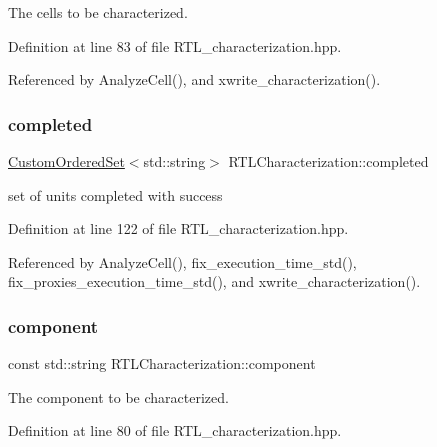 The cells to be characterized. 



Definition at line 83 of file R\+T\+L\+\_\+characterization.\+hpp.



Referenced by Analyze\+Cell(), and xwrite\+\_\+characterization().

\mbox{\label{classRTLCharacterization_abf51e514c27628da4ef919dfb0ce00c8}} 
\subsubsection{\texorpdfstring{completed}{completed}}
{\footnotesize\ttfamily \hyperlink{classCustomOrderedSet}{Custom\+Ordered\+Set}$<$std\+::string$>$ R\+T\+L\+Characterization\+::completed\hspace{0.3cm}{\ttfamily [private]}}



set of units completed with success 



Definition at line 122 of file R\+T\+L\+\_\+characterization.\+hpp.



Referenced by Analyze\+Cell(), fix\+\_\+execution\+\_\+time\+\_\+std(), fix\+\_\+proxies\+\_\+execution\+\_\+time\+\_\+std(), and xwrite\+\_\+characterization().

\mbox{\label{classRTLCharacterization_a81db435891a407a40bdf46b77d6032e3}} 
\subsubsection{\texorpdfstring{component}{component}}
{\footnotesize\ttfamily const std\+::string R\+T\+L\+Characterization\+::component\hspace{0.3cm}{\ttfamily [private]}}



The component to be characterized. 



Definition at line 80 of file R\+T\+L\+\_\+characterization.\+hpp.



